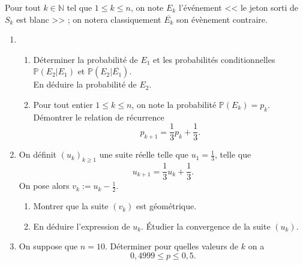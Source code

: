 \documentclass{article}
\newcommand{\NN}{\mathbb N}
\newcommand{\PP}{\mathbb P}
\begin{document}
\begin{figure}[h]
	\centering
{}
\end{figure}

Pour tout $k\in\NN$ tel que $1\leq k\leq n$, on note $E_k$ l'événement << le jeton sorti de $S_k$ est blanc >> ; on notera classiquement $\overline{E_k}$ son évènement contraire.

\begin{enumerate}
	\item \begin{enumerate}
		\item Déterminer la probabilité de $E_1$ et les probabilités conditionnelles $\PP(E_2|E_1)$ et $\PP(E_2|\overline{E_1})$.\\
		En déduire la probabilité de $E_2$.
		\item Pour tout entier $1\leq k\leq n$, on note la probabilité $\PP(E_k) = p_k$.\\
		Démontrer le relation de récurrence
		\[ p_{k+1} = \frac 1 3 p_k + \frac 1 3. \]
	\end{enumerate}
	\item On définit $(u_k)_{k\geq 1}$ une suite réelle telle que $u_1= \frac 1 3$, telle que 
	\[ u_{k+1} = \frac 1 3 u_k + \frac 1 3.\]
	On pose alors $v_k := u_k - \frac 1 2$.
	\begin{enumerate}
		\item Montrer que la suite $(v_k)$ est géométrique.
		\item En déduire l'expression de $u_k$. Étudier la convergence de la suite $(u_k)$.
	\end{enumerate}
	\item On suppose que $n=10$. Déterminer pour quelles valeurs de $k$ on a
	\[ 0{,}4999\leq p \leq 0{,}5. \]
\end{enumerate}
\end{document}
